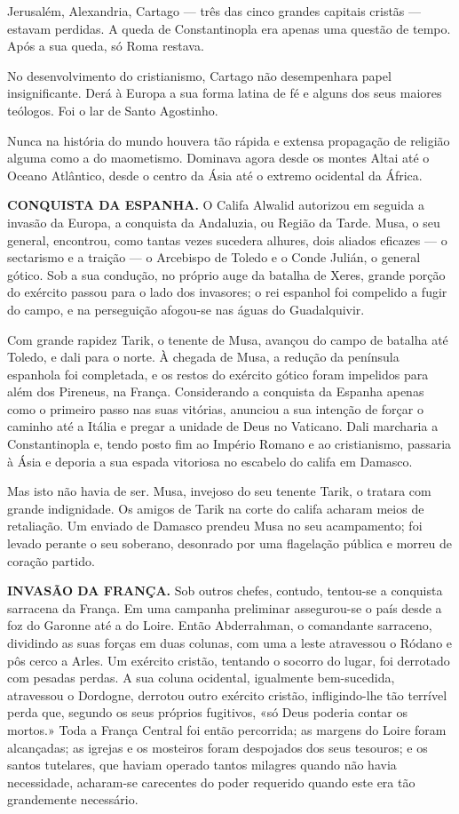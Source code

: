 \documentclass[11pt,a5paper,twoside,openany]{book}
\begin{document}
Jerusalém, Alexandria, Cartago — três das cinco grandes capitais cristãs — estavam perdidas. A queda de Constantinopla era apenas uma questão de tempo. Após a sua queda, só Roma restava.

No desenvolvimento do cristianismo, Cartago não desempenhara papel insignificante. Derá à Europa a sua forma latina de fé e alguns dos seus maiores teólogos. Foi o lar de Santo Agostinho.

Nunca na história do mundo houvera tão rápida e extensa propagação de religião alguma como a do maometismo. Dominava agora desde os montes Altai até o Oceano Atlântico, desde o centro da Ásia até o extremo ocidental da África.

\textbf{CONQUISTA DA ESPANHA.} O Califa Alwalid autorizou em seguida a invasão da Europa, a conquista da Andaluzia, ou Região da Tarde. Musa, o seu general, encontrou, como tantas vezes sucedera alhures, dois aliados eficazes — o sectarismo e a traição — o Arcebispo de Toledo e o Conde Julián, o general gótico. Sob a sua condução, no próprio auge da batalha de Xeres, grande porção do exército passou para o lado dos invasores; o rei espanhol foi compelido a fugir do campo, e na perseguição afogou-se nas águas do Guadalquivir.

Com grande rapidez Tarik, o tenente de Musa, avançou do campo de batalha até Toledo, e dali para o norte. À chegada de Musa, a redução da península espanhola foi completada, e os restos do exército gótico foram impelidos para além dos Pireneus, na França. Considerando a conquista da Espanha apenas como o primeiro passo nas suas vitórias, anunciou a sua intenção de forçar o caminho até a Itália e pregar a unidade de Deus no Vaticano. Dali marcharia a Constantinopla e, tendo posto fim ao Império Romano e ao cristianismo, passaria à Ásia e deporia a sua espada vitoriosa no escabelo do califa em Damasco.

Mas isto não havia de ser. Musa, invejoso do seu tenente Tarik, o tratara com grande indignidade. Os amigos de Tarik na corte do califa acharam meios de retaliação. Um enviado de Damasco prendeu Musa no seu acampamento; foi levado perante o seu soberano, desonrado por uma flagelação pública e morreu de coração partido.

\textbf{INVASÃO DA FRANÇA.} Sob outros chefes, contudo, tentou-se a conquista sarracena da França. Em uma campanha preliminar assegurou-se o país desde a foz do Garonne até a do Loire. Então Abderrahman, o comandante sarraceno, dividindo as suas forças em duas colunas, com uma a leste atravessou o Ródano e pôs cerco a Arles. Um exército cristão, tentando o socorro do lugar, foi derrotado com pesadas perdas. A sua coluna ocidental, igualmente bem-sucedida, atravessou o Dordogne, derrotou outro exército cristão, infligindo-lhe tão terrível perda que, segundo os seus próprios fugitivos, «só Deus poderia contar os mortos.» Toda a França Central foi então percorrida; as margens do Loire foram alcançadas; as igrejas e os mosteiros foram despojados dos seus tesouros; e os santos tutelares, que haviam operado tantos milagres quando não havia necessidade, acharam-se carecentes do poder requerido quando este era tão grandemente necessário.
\end{document}

